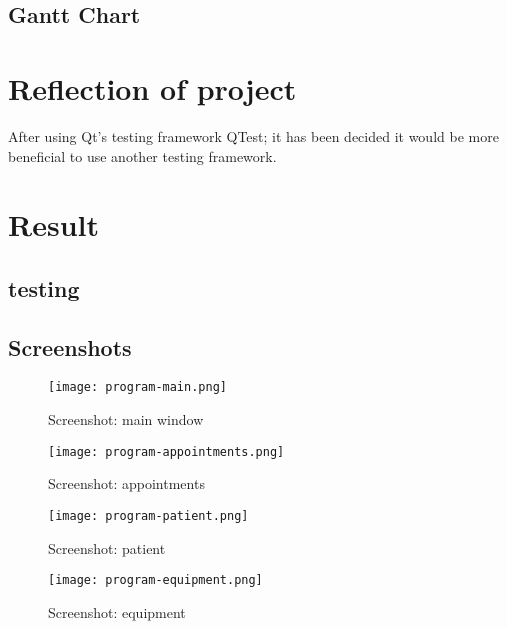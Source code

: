 \documentclass{unitemplate}
\begin{document}
\renewcommand{\arraystretch}{1}


\subsection{Gantt Chart}



\section{Reflection of project}
After using Qt's testing framework QTest; it has been decided it would be more beneficial to use another testing framework.

\clearpage

\section{Result}
\subsection{testing}


\subsection{Screenshots}
\begin{figure}[H]
    \centering
    \texttt{[image: program-main.png]}
    \caption{Screenshot: main window}
\end{figure}

\begin{figure}[H]
    \centering
    \texttt{[image: program-appointments.png]}
    \caption{Screenshot: appointments}
\end{figure}

\begin{figure}[H]
    \centering
    \texttt{[image: program-patient.png]}
    \caption{Screenshot: patient}
\end{figure}

\begin{figure}[H]
    \centering
    \texttt{[image: program-equipment.png]}
    \caption{Screenshot: equipment}
\end{figure}
\end{document}
